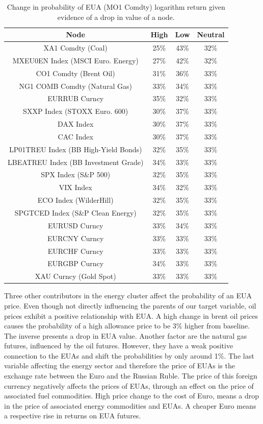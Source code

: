 \documentclass[12pt, letterpaper]{article}
\begin{document}
\begin{table}[ht]
\centering
\small
\begin{tabular}{|c|c|c|c|}
\hline
\textbf{Node} & \textbf{High} & \textbf{Low} & \textbf{Neutral} \\
\hline
XA1 Comdty (Coal) & 25\% & 43\% & 32\% \\
MXEU0EN Index (MSCI Euro. Energy) & 27\% & 42\% & 32\% \\ 
CO1 Comdty (Brent Oil) & 31\% & 36\% & 33\% \\
NG1 COMB Comdty (Natural Gas) & 33\% & 34\% & 33\% \\
EURRUB Curncy & 35\% & 32\% & 33\% \\
SXXP Index (STOXX Euro. 600) & 30\% & 37\% & 33\% \\
DAX Index & 30\% & 37\% & 33\% \\
CAC Index & 30\% & 37\% & 33\% \\ 
LP01TREU Index (BB High-Yield Bonds) & 32\% & 35\% & 33\% \\
LBEATREU Index (BB Investment Grade) & 34\% & 33\% & 33\% \\
SPX Index (S\&P 500) & 32\% & 35\% & 33\% \\
VIX Index & 34\% & 32\% & 33\% \\
ECO Index (WilderHill) & 32\% & 35\% & 33\% \\
SPGTCED Index (S\&P Clean Energy) & 32\% & 35\% & 33\% \\
EURUSD Curncy & 33\% & 34\% & 33\% \\
EURCNY Curncy & 33\% & 33\% & 33\% \\
EURCHF Curncy & 33\% & 33\% & 33\% \\ 
EURGBP Curncy & 34\% & 33\% & 33\% \\
XAU Curncy (Gold Spot) & 33\% & 33\% & 33\% \\
\hline
\end{tabular}
\caption{Change in probability of EUA (MO1 Comdty) logarithm return given evidence of a drop in value of a node.}
\label{tab:evidlow}
\end{table}

Three other contributors in the energy cluster affect the probability of an EUA price. Even though not directly influencing the parents of our target variable, oil prices exhibit a positive relationship with EUA. A high change in brent oil prices causes the probability of a high allowance price to be 3\% higher from baseline. The inverse presents a drop in EUA value. Another factor are the natural gas futures, influenced by the oil futures. However, they have a weak positive connection to the EUAs and shift the probabilities by only around 1\%. The last variable affecting the energy sector and therefore the price of EUAs is the exchange rate between the Euro and the Russian Ruble. The price of this foreign currency negatively affects the prices of EUAs, through an effect on the price of associated fuel commodities. High price change to the cost of Euro, means a drop in the price of associated energy commodities and EUAs. A cheaper Euro means a respective rise in returns on EUA futures.
\end{document}
